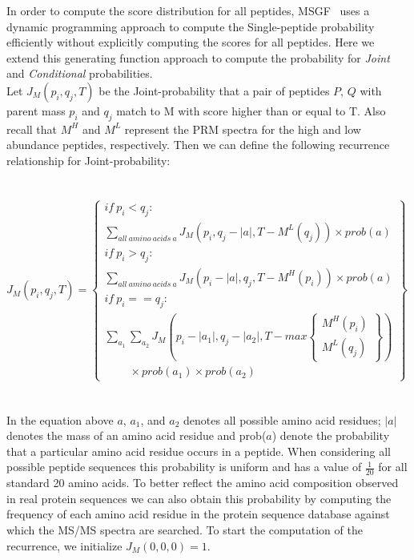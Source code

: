 \documentclass[runningheads,a4paper]{llncs}
\begin{document}
In order to compute the score distribution for all peptides, MSGF~\cite{kim2008spectral} uses a dynamic programming approach to compute the Single-peptide probability efficiently without explicitly computing the scores for all peptides.  Here we extend this generating function approach to compute the probability for \emph{Joint} and \emph{Conditional} probabilities. \\
Let $J_M(p_{i}, q_{j}, T)$ be the Joint-probability that a pair of peptides $P$, $Q$ with parent mass $p_{i}$ and $q_{j}$ match to M with score higher than or equal to T. Also recall that $M^{H}$ and $M^{L}$ represent the PRM spectra for the high and low abundance peptides, respectively.  Then we can define the following recurrence relationship for Joint-probability: \\
\\
\\
$J_M(p_{i},q_{j},T) = \left\{
\begin{array}{l}
  if\ p_{i} < q_{j}: \\
      \displaystyle\sum\limits_{all\ amino\ acids\ a}{J_M(p_{i}, q_{j} - |a|, T - M^{L}(q_{j}))\times prob(a)} \\
  if\ p_{i} > q_{j}:\\
      \displaystyle\sum\limits_{all\ amino\ acids\ a}{ J_M(p_{i} - |a|, q_{j}, T - M^{H}(p_{i}))\times prob(a)} \\
  if\ p_{i} == q_{j}: \\
  \sum\limits_{a_1}{\sum\limits_{a_2}{J_M(p_{i} - |a_1|, q_{j} - |a_2|,
        T - max \left\{
                  \begin{array}{c}
                   M^{H}(p_{i}) \\
                   M^{L}(q_{j})
                  \end{array}
                 \right\})}} \\
                 \ \ \ \ \ \ \ \ \ \ \times prob(a_1) \times prob(a_2)
\end{array}
\right\}
$
\\
\\
\\
In the equation above $a$, $a_1$, and $a_2$ denotes all possible amino acid residues; $|a|$ denotes the mass of an amino acid residue and prob($a$) denote the probability that a particular amino acid residue occurs in a peptide.  When considering all possible peptide sequences this probability is uniform and has a value of $\frac{1}{20}$ for all standard 20 amino acids. To better reflect the amino acid composition observed in real protein sequences we can also obtain this probability by computing the frequency of each amino acid residue in the protein sequence database against which the MS/MS spectra are searched.  To start the computation of the recurrence, we initialize $J_M(0,0,0)=1$.
\end{document}
